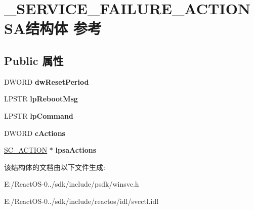 \hypertarget{struct___s_e_r_v_i_c_e___f_a_i_l_u_r_e___a_c_t_i_o_n_s_a}{}\section{\+\_\+\+S\+E\+R\+V\+I\+C\+E\+\_\+\+F\+A\+I\+L\+U\+R\+E\+\_\+\+A\+C\+T\+I\+O\+N\+S\+A结构体 参考}
\label{struct___s_e_r_v_i_c_e___f_a_i_l_u_r_e___a_c_t_i_o_n_s_a}
\subsection*{Public 属性}
\begin{DoxyCompactItemize}
\item 
\mbox{\label{struct___s_e_r_v_i_c_e___f_a_i_l_u_r_e___a_c_t_i_o_n_s_a_a52fae074803d9910e5edc5f39f3e1332}} 
D\+W\+O\+RD {\bfseries dw\+Reset\+Period}
\item 
\mbox{\label{struct___s_e_r_v_i_c_e___f_a_i_l_u_r_e___a_c_t_i_o_n_s_a_aff37448199d629e31ee20a32e4b9601f}} 
L\+P\+S\+TR {\bfseries lp\+Reboot\+Msg}
\item 
\mbox{\label{struct___s_e_r_v_i_c_e___f_a_i_l_u_r_e___a_c_t_i_o_n_s_a_a9fc43f138b908934e06b6c90610d415d}} 
L\+P\+S\+TR {\bfseries lp\+Command}
\item 
\mbox{\label{struct___s_e_r_v_i_c_e___f_a_i_l_u_r_e___a_c_t_i_o_n_s_a_a6f2d6062474705a4ef2e15f3633f6c40}} 
D\+W\+O\+RD {\bfseries c\+Actions}
\item 
\mbox{\label{struct___s_e_r_v_i_c_e___f_a_i_l_u_r_e___a_c_t_i_o_n_s_a_af4aa88091387292bdf23b7b6e4de9e2b}} 
\hyperlink{struct___s_c___a_c_t_i_o_n}{S\+C\+\_\+\+A\+C\+T\+I\+ON} $\ast$ {\bfseries lpsa\+Actions}
\end{DoxyCompactItemize}


该结构体的文档由以下文件生成\+:\begin{DoxyCompactItemize}
\item 
E\+:/\+React\+O\+S-\/0../sdk/include/psdk/winsvc.\+h\item 
E\+:/\+React\+O\+S-\/0../sdk/include/reactos/idl/svcctl.\+idl\end{DoxyCompactItemize}

